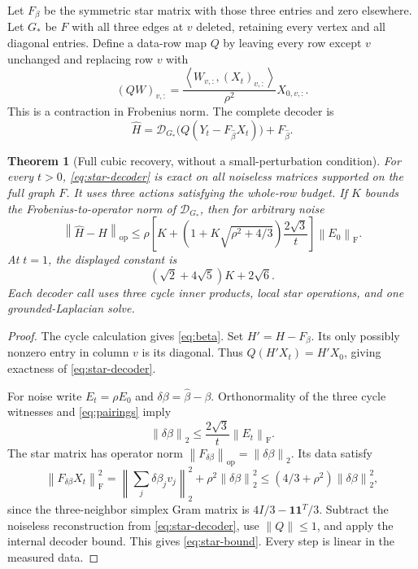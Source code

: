 \documentclass[11pt]{article}
\newtheorem{theorem}{Theorem}[section]
\theoremstyle{remark}\newtheorem{remark}[theorem]{Remark}
\newcommand{\one}{\mathbf 1}
\newcommand{\op}{\mathrm{op}}
\newcommand{\F}{\mathrm F}
\newcommand{\norm}[1]{\left\lVert #1\right\rVert}
\newcommand{\ip}[2]{\left\langle #1,#2\right\rangle}
\begin{document}
Let $F_\beta$ be the symmetric star matrix with those three entries and zero elsewhere. Let $G_*$ be $F$ with all three edges at $v$ deleted, retaining every vertex and all diagonal entries. Define a data-row map $Q$ by leaving every row except $v$ unchanged and replacing row $v$ with
\begin{equation}\label{eq:rowmap}
(QW)_{v,:}=\frac{\ip{W_{v,:}}{(X_t)_{v,:}}}{\rho^2}X_{0,v,:}.
\end{equation}
This is a contraction in Frobenius norm. The complete decoder is
\begin{equation}\label{eq:star-decoder}
\widehat H=\mathcal D_{G_*}\bigl(Q(Y_t-F_{\widehat\beta}X_t)\bigr)+F_{\widehat\beta}.
\end{equation}

\begin{theorem}[Full cubic recovery, without a small-perturbation condition]\label{thm:full}
For every $t>0$, \eqref{eq:star-decoder} is exact on all noiseless matrices supported on the full graph $F$. It uses three actions satisfying the whole-row budget. If $K$ bounds the Frobenius-to-operator norm of $\mathcal D_{G_*}$, then for arbitrary noise
\begin{equation}\label{eq:star-bound}
\norm{\widehat H-H}_{\op}\leq
\rho\left[K+\left(1+K\sqrt{\rho^2+4/3}\right)\frac{2\sqrt3}{t}\right]\norm{E_0}_{\F}.
\end{equation}
At $t=1$, the displayed constant is
\begin{equation}\label{eq:t1bound}
(\sqrt2+4\sqrt5)K+2\sqrt6.
\end{equation}
Each decoder call uses three cycle inner products, local star operations, and one grounded-Laplacian solve.
\end{theorem}

\begin{proof}
The cycle calculation gives \eqref{eq:beta}. Set $H'=H-F_\beta$. Its only possibly nonzero entry in column $v$ is its diagonal. Thus
$Q(H'X_t)=H'X_0$, giving exactness of \eqref{eq:star-decoder}.

For noise write $E_t=\rho E_0$ and $\delta\beta=\widehat\beta-\beta$. Orthonormality of the three cycle witnesses and \eqref{eq:pairings} imply
\[
\norm{\delta\beta}_2\leq\frac{2\sqrt3}{t}\norm{E_t}_{\F}.
\]
The star matrix has operator norm $\norm{F_{\delta\beta}}_{\op}=\norm{\delta\beta}_2$. Its data satisfy
\[
\norm{F_{\delta\beta}X_t}_{\F}^2
=\norm{\textstyle\sum_j\delta\beta_j v_j}_2^2+\rho^2\norm{\delta\beta}_2^2
\leq(4/3+\rho^2)\norm{\delta\beta}_2^2,
\]
since the three-neighbor simplex Gram matrix is $4I/3-\one\one^T/3$.
Subtract the noiseless reconstruction from \eqref{eq:star-decoder}, use $\norm Q\leq1$, and apply the internal decoder bound. This gives \eqref{eq:star-bound}. Every step is linear in the measured data.
\end{proof}
\end{document}
